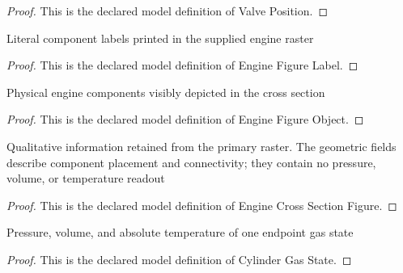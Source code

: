 \begin{proof}
  This is the declared model definition of Valve Position.
\end{proof}
\begin{definition}
  \label{def:physics:phyx-mini-0469:phyxminiproblems-problemphyxmini0469-enginefigurelabel}
  Literal component labels printed in the supplied engine raster
\end{definition}
\begin{proof}
  This is the declared model definition of Engine Figure Label.
\end{proof}
\begin{definition}
  \label{def:physics:phyx-mini-0469:phyxminiproblems-problemphyxmini0469-enginefigureobject}
  Physical engine components visibly depicted in the cross section
\end{definition}
\begin{proof}
  This is the declared model definition of Engine Figure Object.
\end{proof}
\begin{definition}
  \label{def:physics:phyx-mini-0469:phyxminiproblems-problemphyxmini0469-enginecrosssectionfigure}
  Qualitative information retained from the primary raster. The geometric fields describe component placement and connectivity; they contain no pressure, volume, or temperature readout
\end{definition}
\begin{proof}
  This is the declared model definition of Engine Cross Section Figure.
\end{proof}
\begin{definition}
  \label{def:physics:phyx-mini-0469:phyxminiproblems-problemphyxmini0469-cylindergasstate}
  Pressure, volume, and absolute temperature of one endpoint gas state
\end{definition}
\begin{proof}
  This is the declared model definition of Cylinder Gas State.
\end{proof}
